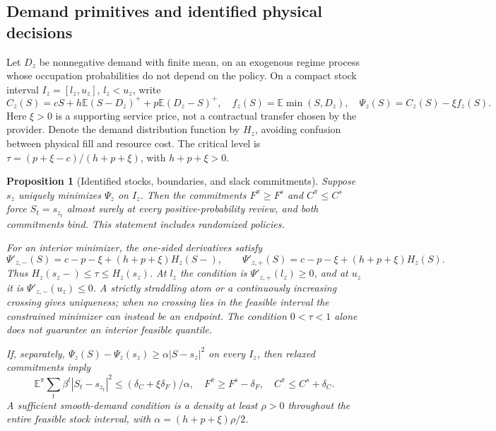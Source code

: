 \documentclass[11pt,letterpaper]{article}
\newtheorem{proposition}[theorem]{Proposition}
\theoremstyle{definition}
\newcommand{\E}{\mathbb E}
\newcommand{\1}{\mathbf 1}
\begin{document}
\subsection{Demand primitives and identified physical decisions}
Let $D_z$ be nonnegative demand with finite mean, on an exogenous regime process whose occupation probabilities do not depend on the policy. On a compact stock interval $I_z=[l_z,u_z]$, $l_z<u_z$, write
\[
 C_z(S)=cS+h\E(S-D_z)^++p\E(D_z-S)^+,\quad
 f_z(S)=\E\min(S,D_z),\quad \Psi_z(S)=C_z(S)-\xi f_z(S).
\]
Here $\xi>0$ is a supporting service price, not a contractual transfer chosen by the provider. Denote the demand distribution function by $H_z$, avoiding confusion between physical fill and resource cost. The critical level is $\tau=(p+\xi-c)/(h+p+\xi)$, with $h+p+\xi>0$.

\begin{proposition}[Identified stocks, boundaries, and slack commitments]\label{prop:r10-stock}
Suppose $s_z$ uniquely minimizes $\Psi_z$ on $I_z$. Then the commitments $F^\pi\geq F^s$ and $C^\pi\leq C^s$ force $S_t=s_{z_t}$ almost surely at every positive-probability review, and both commitments bind. This statement includes randomized policies.

For an interior minimizer, the one-sided derivatives satisfy
\[
 \Psi'_{z,-}(S)=c-p-\xi+(h+p+\xi)H_z(S-),\qquad
 \Psi'_{z,+}(S)=c-p-\xi+(h+p+\xi)H_z(S).
\]
Thus $H_z(s_z-)\leq\tau\leq H_z(s_z)$. At $l_z$ the condition is $\Psi'_{z,+}(l_z)\geq0$, and at $u_z$ it is $\Psi'_{z,-}(u_z)\leq0$. A strictly straddling atom or a continuously increasing crossing gives uniqueness; when no crossing lies in the feasible interval the constrained minimizer can instead be an endpoint. The condition $0<\tau<1$ alone does not guarantee an interior feasible quantile.

If, separately, $\Psi_z(S)-\Psi_z(s_z)\geq\alpha|S-s_z|^2$ on every $I_z$, then relaxed commitments imply
\begin{equation}\label{eq:r10-pin}
 \E^\pi\sum_t\beta^t|S_t-s_{z_t}|^2
 \leq(\delta_C+\xi\delta_F)/\alpha,
 \quad F^\pi\geq F^s-\delta_F,\quad C^\pi\leq C^s+\delta_C.
\end{equation}
A sufficient smooth-demand condition is a density at least $\rho>0$ throughout the entire feasible stock interval, with $\alpha=(h+p+\xi)\rho/2$.
\end{proposition}
\end{document}

